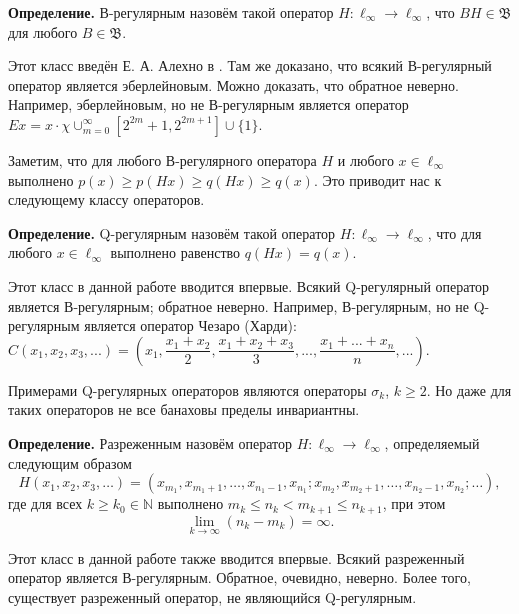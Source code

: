 \documentclass[a4paper,14pt]{article}
\begin{document}
	\textbf{Определение.}
	В-регулярным назовём такой оператор $H:\ell_\infty \to \ell_\infty$,
	что $B H \in \mathfrak B$ для любого $B\in \mathfrak B$.

	Этот класс введён Е. А. Алехно в
	\cite{alekhno2018invariant}.
	Там же доказано, что всякий В-регулярный оператор является эберлейновым.
	Можно доказать, что обратное неверно.
	Например, эберлейновым, но не В-регулярным является оператор
	$
	Ex = x \cdot \chi {\cup_{m=0}^{\infty}\left[2^{2 m}+1, 2^{2 m+1}\right] \cup\{1\}}
	$.

	Заметим, что для любого В-регулярного оператора $H$ и любого $x\in \ell_\infty$ выполнено
	$p(x) \geq p(Hx) \geq q(Hx) \geq q(x)$.
	Это приводит нас к следующему классу операторов.

	\textbf{Определение.} Q-регулярным назовём такой оператор $H:\ell_\infty\to \ell_\infty$,
	что для любого $x\in\ell_\infty$ выполнено равенство $q(Hx) = q(x)$.


	Этот класс в данной работе вводится впервые.
	Всякий Q-регулярный оператор является В-регулярным;
	обратное неверно.
	Например, В-регулярным, но не Q-регулярным является оператор Чезаро (Харди):
	$
	C (x_1, x_2, x_3, ...) = \left(
	x_1,
	\dfrac{x_1+x_2}2,
	\dfrac{x_1+x_2 + x_3}3,
	...,
	\dfrac{x_1+...+x_n}n,
	...\right)
	.
	$


	Примерами Q-регулярных операторов являются операторы $\sigma_k$, $k\ge 2$.
	Но даже для таких операторов не все банаховы пределы инвариантны.

	\textbf{Определение.}
	Разреженным назовём оператор $H: \ell_\infty \to \ell_\infty$,
	определяемый следующим образом
	$$
	H(x_1, x_2, x_3, \ldots) = (x_{m_1}, x_{m_1 + 1}, \ldots, x_{n_1 - 1}, x_{n_1};
	x_{m_2}, x_{m_2 + 1}, \ldots, x_{n_2 - 1}, x_{n_2}; \ldots),
	$$
	где для всех
	$k \geqslant k_0 \in \mathbb N$
	выполнено
	$
	m_k \leqslant n_k < m_{k+1}\leqslant n_{k+1}
	$,
	при этом
	$$
	\lim\limits_{k \to \infty} (n_k - m_k) = \infty
	.
	$$

	Этот класс в данной работе также вводится впервые.
	Всякий разреженный оператор является В-регулярным.
	Обратное, очевидно, неверно.
	Более того, существует разреженный оператор, не являющийся Q-регулярным.


	\setcounter{equation}{0}
	\setcounter{figure}{0}
\end{document}
